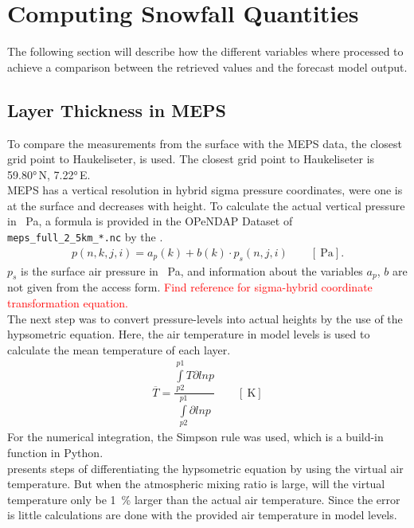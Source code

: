 \section{Computing Snowfall Quantities} \label{sec:data_proc}
The following section will describe how the different variables where processed to achieve a comparison between the retrieved values and the forecast model output. 

\subsection{Layer Thickness in MEPS}\label{sec:layer_thickness}
To compare the measurements from the surface with the MEPS data, the closest grid point to Haukeliseter, is used. The closest grid point to Haukeliseter is \ang{59.80}\,N, \ang{7.22}\,E.
\\
MEPS has a vertical resolution in hybrid sigma pressure coordinates, were one is at the surface and decreases with height. To calculate the actual vertical pressure in \SI{}{\Pa}, a formula is provided in the OPeNDAP Dataset of \texttt{meps\_full\_2\_5km\_*.nc} by the \citet{norwegian_meteorological_institute_met_2016}.  
\begin{align}
	p(n,k,j,i) = a_p(k) + b(k) \cdot p_s(n,j,i) \qquad [\SI{}{\Pa}].
	\label{eq:hybrid_sigma_pressure}
\end{align}
$p_s$ is the surface air pressure in \SI{}{\Pa}, and information about the variables $a_p$, $b$ are not given from the access form. \textcolor{red}{Find reference for sigma-hybrid coordinate transformation equation.}  
\\
The next step was to convert pressure-levels into actual heights by the use of the hypsometric equation. Here, the air temperature in model levels is used to calculate the mean temperature of each layer. 
\begin{align}
	\overline{T} = \dfrac{\int\limits_{p2}^{p1} T \partial ln p}{\int\limits_{p2}^{p1}\partial ln p} \qquad [\SI{}{\kelvin}]
	\label{eq:T_avg}
\end{align}
For the numerical integration, the Simpson rule was used, which is a build-in function in Python. \\
\citet{martin_mid-latitude_2006} presents steps of differentiating the hypsometric equation by using the virtual air temperature. But when the atmospheric mixing ratio is large, will the virtual temperature only be \SI{1}{\percent} larger than the actual air temperature. Since the error is little calculations are done with the provided air temperature in model levels.
